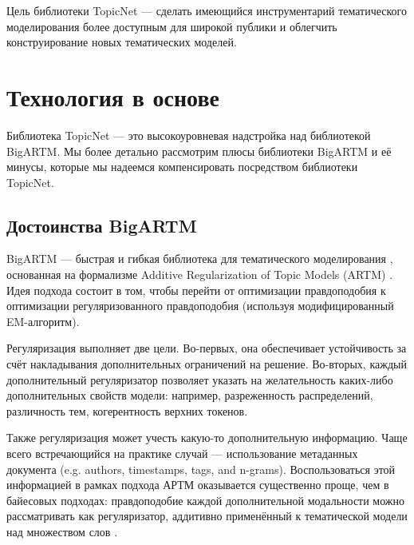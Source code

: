 Цель библиотеки TopicNet --- сделать имеющийся инструментарий тематического моделирования более доступным для широкой публики и облегчить конструирование новых тематических моделей.  


\section{Технология в основе} 

Библиотека TopicNet --- это высокоуровневая надстройка над библиотекой BigARTM. Мы более детально рассмотрим плюсы библиотеки \mbox{BigARTM} и её минусы, которые мы надеемся компенсировать посредством библиотеки TopicNet.  

\subsection{Достоинства BigARTM} 


BigARTM --- быстрая и гибкая библиотека для тематического моделирования \cite{frei2016parallel}, основанная на формализме Additive Regularization of Topic Models (ARTM) \cite{voron14dan-eng}. Идея подхода состоит в том, чтобы перейти от оптимизации правдоподобия к оптимизации регуляризованного правдоподобия (используя модифицированный EM-алгоритм).

Регуляризация выполняет две цели. Во-первых, она обеспечивает устойчивость за счёт накладывания дополнительных ограничений на решение. Во-вторых, каждый дополнительный регуляризатор позволяет указать на желательность каких-либо дополнительных свойств модели: например, разреженность распределений, различность тем, когерентность верхних токенов.  

Также регуляризация может учесть какую-то дополнительную информацию. Чаще всего встречающийся на практике случай --- использование метаданных документа (e.g. authors, timestamps, tags, and n-grams). Воспользоваться этой информацией в рамках подхода АРТМ оказывается существенно проще, чем в байесовых подходах: правдоподобие каждой дополнительной модальности можно рассматривать как регуляризатор, аддитивно применённый к тематической модели над множеством слов \cite{voron15nonbayesian}.  

